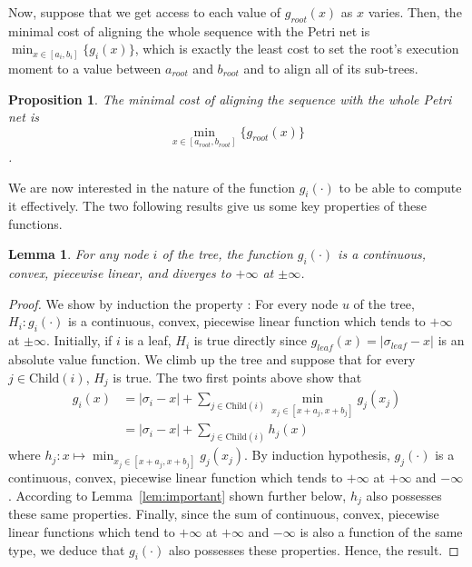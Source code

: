 \documentclass[conference]{IEEEtran}
\newtheorem{lemma}[theorem]{Lemma}
\newtheorem{proposition}{Proposition}
\begin{document}
Now, suppose that we get access 
to each value of $g_{root}(x)$ as $x$ varies. Then, the minimal cost of aligning the 
whole sequence with the Petri net is $\min_{x\in[a_i,b_i]}\{g_{i}(x)\}$, which 
is exactly the least cost to set the root's execution moment to a value between
$a_{root}$ and $b_{root}$ and to align all of its sub-trees.

\begin{proposition}
    The minimal cost of aligning the sequence with the whole Petri net 
    is \[\min_{x\in[a_{root},b_{root}]}\{g_{root}(x)\}\]. 
\end{proposition}

We are now interested in the nature of the function $g_{i}(\cdot)$ to be able to compute it effectively. 
The two following results give us some key properties of these functions.

\begin{lemma}\label{tree-like}
    For any node $i$ of the tree, the function $g_{i}(\cdot)$ is a continuous, convex, 
    piecewise linear, and diverges to $+\infty$ at $\pm\infty$.
\end{lemma}
\begin{proof}
	We show by induction the property : For every node $u$ of the 
	tree, $H_i: g_{i}(\cdot)$ is a continuous, convex, piecewise linear function 
	which tends to $+\infty$ at $\pm\infty$.
	Initially, if $i$ is a leaf, $H_i$ is true directly since 
	$g_{leaf}(x) = |\sigma_{leaf} - x|$ is an absolute value function. 
	We climb up the tree and suppose that for every 
	$j \in \text{Child}(i)$, $H_j$ is true. The two first points above show that
	\begin{equation}
			\begin{split}
					g_{i}(x) & = |\sigma_{i}-x| + \sum_{j \in \text{Child}(i)}\min_{x_{j}\in[x+a_{j},x+b_{j}]}g_{j}(x_{j}) \\
					& = |\sigma_{i}-x| + \sum_{j \in \text{Child}(i)}h_j(x)
			\end{split}
	\end{equation}
	where $h_j : x\mapsto \min_{x_{j}\in[x+a_{j},x+b_{j}]}g_{j}(x_{j})$. 
	By induction hypothesis, $g_{j}(\cdot)$ is a continuous, convex, piecewise linear function 
	which tends to $+\infty$ at $+\infty$ and $-\infty$. According to 
	Lemma~\ref{lem:important} shown further below, $h_j$ also possesses these same properties. 
	Finally, since the sum of continuous, convex, piecewise linear functions 
	which tend to $+\infty$ at $+\infty$ and $-\infty$ is also a 
	function of the same type, 
	we deduce that $g_{i}(\cdot)$ also possesses these properties. Hence, the result.
\end{proof}
\end{document}
